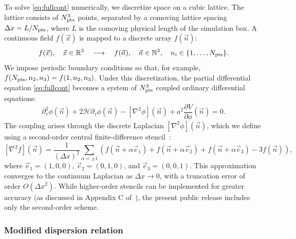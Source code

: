\documentclass[aps, nofootinbib,superscriptaddress, preprintnumbers, longbibliography]{article}
\begin{document}
To solve \cref{eq:fullcont} numerically, we discretize space on a cubic lattice. The lattice consists of $N_{\rm pts}^3$ points, separated by a comoving lattice spacing $\Delta x = L / N_{\rm pts}$, where $L$ is the comoving physical length of the simulation box. A continuous field $f(\vec{x})$ is mapped to a discrete array $f(\vec{n})$:
\begin{equation}
\label{eq:discretization}
f(\vec{x}), \quad \vec{x} \in \mathbb{R}^3 \quad\longrightarrow\quad f(\vec{n}), \quad \vec{n} \in \mathbb{N}^3,\quad n_i \in \{1, \dots, N_{\rm pts}\}.
\end{equation}
We impose periodic boundary conditions so that, for example, $f(N_{\rm pts}, n_2, n_3) = f(1, n_2, n_3)$. Under this discretization, the partial differential equation \cref{eq:fullcont} becomes a system of $N_{\rm pts}^3$ coupled ordinary differential equations:
\begin{equation}
\label{eq:disc}
\partial_\tau^2 \phi(\vec{n}) + 2\mathcal{H}\partial_\tau \phi(\vec{n}) - [\nabla^2 \phi](\vec{n}) + a^2 \frac{\partial V}{\partial \phi}(\vec{n}) = 0.
\end{equation}
The coupling arises through the discrete Laplacian $[\nabla^2 \phi](\vec{n})$, which we define using a second-order central finite-difference stencil~\cite{press1986numerical}:
\begin{equation}
\label{eq:discretelaplacian}
[\nabla^2 f](\vec{n}) = \frac{1}{(\Delta x)^2} \sum_{\alpha = \pm 1} \left(
f(\vec{n} + \alpha \vec{e}_1) + f(\vec{n} + \alpha \vec{e}_2) + f(\vec{n} + \alpha \vec{e}_3) - 3f(\vec{n})
\right),
\end{equation}
where $\vec{e}_1 = (1, 0, 0)$, $\vec{e}_2 = (0, 1, 0)$, and $\vec{e}_3 = (0, 0, 1)$. This approximation converges to the continuum Laplacian as $\Delta x \rightarrow 0$, with a truncation error of order $O(\Delta x^2)$. While higher-order stencils can be implemented for greater accuracy (as discussed in Appendix C of~\cite{Caravano:2021pgc}), the present public release includes only the second-order scheme.

\subsubsection{Modified dispersion relation}
\label{sec:modified}
\end{document}
